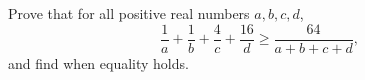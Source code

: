 Prove that for all positive real numbers $a,b,c,d$,
\[\dfrac{1}{a}+\dfrac{1}{b}+\dfrac{4}{c}+\dfrac{16}{d}\ge\dfrac{64}{a+b+c+d},\]
and find when equality holds.
